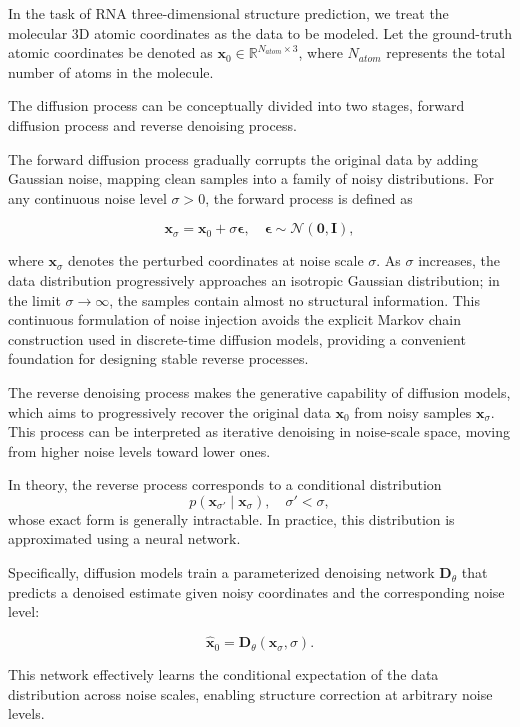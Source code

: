 In the task of RNA three-dimensional structure prediction, we treat the molecular 3D atomic coordinates as the data to be modeled. Let the ground-truth atomic coordinates be denoted as  $\mathbf{x}_0 \in \mathbb{R}^{N_{atom} \times 3}$,  where $N_{atom}$ represents the total number of atoms in the molecule.

The diffusion process can be conceptually divided into two stages, forward diffusion process and reverse denoising process.

The forward diffusion process gradually corrupts the original data by adding Gaussian noise, mapping clean samples into a family of noisy distributions. For any continuous noise level $\sigma > 0$, the forward process is defined as

$$  
\mathbf{x}_\sigma = \mathbf{x}_0 + \sigma \boldsymbol{\epsilon},  
\quad \boldsymbol{\epsilon} \sim \mathcal{N}(\mathbf{0}, \mathbf{I}),  
$$

where $\mathbf{x}_\sigma$ denotes the perturbed coordinates at noise scale $\sigma$. As $\sigma$ increases, the data distribution progressively approaches an isotropic Gaussian distribution; in the limit $\sigma \to \infty$, the samples contain almost no structural information. This continuous formulation of noise injection avoids the explicit Markov chain construction used in discrete-time diffusion models, providing a convenient foundation for designing stable reverse processes.


The reverse denoising process makes the generative capability of diffusion models, which aims to progressively recover the original data $\mathbf{x}_0$ from noisy samples $\mathbf{x}_\sigma$. This process can be interpreted as iterative denoising in noise-scale space, moving from higher noise levels toward lower ones.

In theory, the reverse process corresponds to a conditional distribution
$$  
p(\mathbf{x}_{\sigma'} \mid \mathbf{x}_\sigma),  
\quad \sigma' < \sigma,  
$$
whose exact form is generally intractable. In practice, this distribution is approximated using a neural network.

Specifically, diffusion models train a parameterized denoising network $\mathbf{D}_\theta$ that predicts a denoised estimate given noisy coordinates and the corresponding noise level:

$$  
\hat{\mathbf{x}}_0 = \mathbf{D}_\theta(\mathbf{x}_\sigma, \sigma).  
$$

This network effectively learns the conditional expectation of the data distribution across noise scales, enabling structure correction at arbitrary noise levels.


